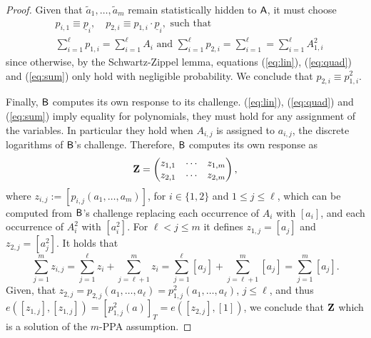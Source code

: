 \begin{proof}
Given that $\tilde{a}_{1},\ldots,\tilde{a}_{m}$ remain statistically hidden to $\mathsf{A}$, it must choose
\begin{align*}
&p_{i,1}\equiv \underline{p}_i, \quad p_{2,i}\equiv p_{1,i}\cdot \underline{p}_i,\text{ such that }\\
&\sum_{i=1}^\ell p_{1,i} = \sum_{i=1}^\ell A_{i} \text{ and } \sum_{i=1}^\ell p_{2,i} = \sum_{i=1}^\ell = \sum_{i=1}^\ell A_{1,i}^2
\end{align*}
since otherwise, by the Schwartz-Zippel lemma, equations (\ref{eq:lin}), (\ref{eq:quad}) and (\ref{eq:sum}) only hold with negligible probability. We conclude that $p_{2,i}\equiv p^2_{1,i}$.

Finally, $\mathsf{B}$ computes its own response to its challenge. (\ref{eq:lin}), (\ref{eq:quad}) and (\ref{eq:sum}) imply equality for polynomials, they must hold for any assignment of the variables. In particular they hold when $A_{i,j}$ is assigned to $a_{i,j}$, the discrete logarithms of $\mathsf{B}$'s challenge. Therefore, $\mathsf{B}$ computes its own response as
$$
\mathbf{{Z}} = \begin{pmatrix}
	z_{1,1}&\cdots&z_{1,m}\\z_{2,1}&\cdots&z_{2,m}
\end{pmatrix},
$$
where $z_{i,j} := [p_{i,j}(a_{1},\ldots,a_m)]$, for $i\in\{1,2\}$ and $1\leq j \leq \ell$, which can be computed from $\mathsf{B}$'s challenge replacing each occurrence of $A_i$ with $[a_i]$, and each occurrence of $A_i^2$ with  $[a_i^2]$. For $\ell < j\leq m$ it defines $z_{1,j} = [a_j]$ and $z_{2,j} = [a_j^2]$. It holds that
$$
\sum_{j=1}^m z_{i,j} = \sum_{j=1}^\ell z_i + \sum_{j=\ell+1}^m z_i = \sum_{j=1}^\ell [a_j] + \sum_{j=\ell+1}^m [a_j] = \sum_{j=1}^m [a_j].
$$
Given, that $z_{2,j} = p_{2,j}(a_1,\ldots,a_\ell) = p_{1,j}^2(a_1,\ldots,a_\ell)$, $j\leq \ell$, and thus $e([z_{1,j}],[z_{1,j}]) = [p_{1,j}^2(a)]_T = e([z_{2,j}],[1])$, we conclude that  $\mathbf{{Z}}$ which is a solution of the $m$-PPA assumption.
\end{proof}

